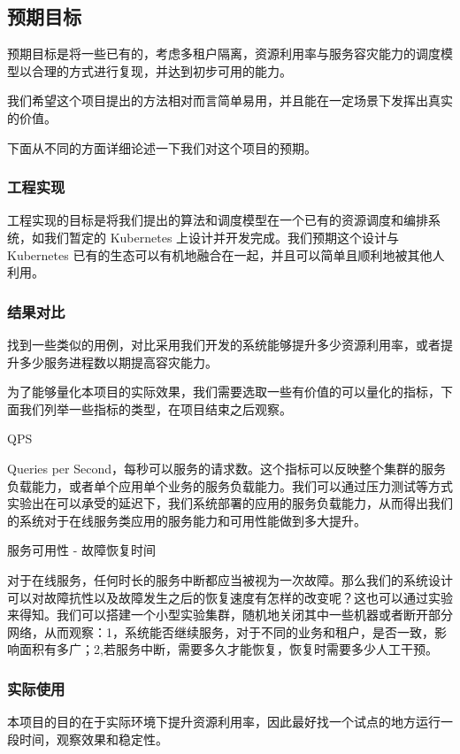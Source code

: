 \subsection{预期目标}

预期目标是将一些已有的，考虑多租户隔离，资源利用率与服务容灾能力的调度模型以合理的方式进行复现，并达到初步可用的能力。

我们希望这个项目提出的方法相对而言简单易用，并且能在一定场景下发挥出真实的价值。

下面从不同的方面详细论述一下我们对这个项目的预期。

\subsubsection{工程实现}

工程实现的目标是将我们提出的算法和调度模型在一个已有的资源调度和编排系统，如我们暂定的 Kubernetes 上设计并开发完成。我们预期这个设计与 Kubernetes 已有的生态可以有机地融合在一起，并且可以简单且顺利地被其他人利用。

\subsubsection{结果对比}

找到一些类似的用例，对比采用我们开发的系统能够提升多少资源利用率，或者提升多少服务进程数以期提高容灾能力。

为了能够量化本项目的实际效果，我们需要选取一些有价值的可以量化的指标，下面我们列举一些指标的类型，在项目结束之后观察。

QPS

Queries per Second，每秒可以服务的请求数。这个指标可以反映整个集群的服务负载能力，或者单个应用单个业务的服务负载能力。我们可以通过压力测试等方式实验出在可以承受的延迟下，我们系统部署的应用的服务负载能力，从而得出我们的系统对于在线服务类应用的服务能力和可用性能做到多大提升。

服务可用性 - 故障恢复时间

对于在线服务，任何时长的服务中断都应当被视为一次故障。那么我们的系统设计可以对故障抗性以及故障发生之后的恢复速度有怎样的改变呢？这也可以通过实验来得知。我们可以搭建一个小型实验集群，随机地关闭其中一些机器或者断开部分网络，从而观察：1，系统能否继续服务，对于不同的业务和租户，是否一致，影响面积有多广；2,若服务中断，需要多久才能恢复，恢复时需要多少人工干预。

\subsubsection{实际使用}

本项目的目的在于实际环境下提升资源利用率，因此最好找一个试点的地方运行一段时间，观察效果和稳定性。
